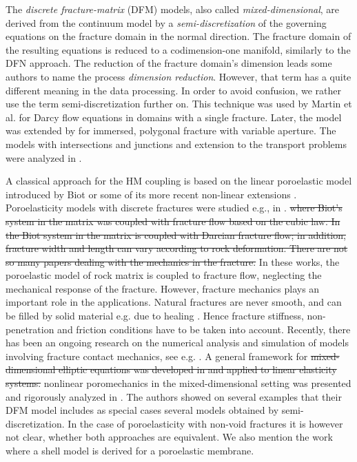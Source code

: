 \documentclass[a4paper]{article}
\numberwithin{equation}{section}
\def\js#1{{\color{blue}#1}}
\begin{document}
The \textit{discrete fracture-matrix} (DFM) models, also called \textit{mixed-dimensional}, are derived from the continuum model by a \textit{semi-discretization} of the governing equations on the fracture domain
in the normal direction. The fracture domain of the resulting equations is reduced to a codimension-one manifold, similarly to the DFN approach. The reduction of the fracture domain's dimension leads some authors to name the process \textit{dimension reduction}. However, that term has a quite different meaning in the data processing. In order to avoid confusion, we rather use the term semi-discretization further on.
% 
This technique was used by Martin et al. \cite{martin_modeling_2005} for Darcy flow equations in domains with a single fracture.
Later, the model was extended by \cite{angot2009asymptotic} for immersed, polygonal fracture with variable aperture. The models with intersections and junctions and extension to the transport problems were analyzed in \cite{maryska2005numerical,pichot2012generalized,formaggia2014reduced, schwenck2015dimensionally,hokr2016real}.

A classical approach for the HM coupling is based on the linear poroelastic model introduced by Biot \cite{biot1941general} or some of its more recent non-linear extensions \cite{rutqvist2003role,Jing2007Fluid}. 
Poroelasticity models with discrete fractures were studied e.g., in \cite{ganis2014modeling,girault_lubrication,girault2019mixed,bukac2017dimensional,hanowski2018hydromechanical}.
\js{\sout{ where Biot's system in the matrix was coupled with fracture flow based on the cubic law.
In %
the Biot system in the matrix is coupled with Darcian fracture flow; in addition, fracture width and length can vary according to rock deformation.
There are not so many papers dealing with the mechanics in the fracture.}
In these works, the poroelastic model of rock matrix is coupled to fracture flow, neglecting the mechanical response of the fracture.
However, fracture mechanics plays an important role in the applications. Natural fractures are never smooth, and can be filled by solid material e.g. due to healing \cite{vass}. Hence fracture stiffness, non-penetration and friction conditions have to be taken into account.
Recently, there has been an ongoing research on the numerical analysis and simulation of models involving fracture contact mechanics, see e.g. \cite{garipov2016discrete,franceschini2020algebraically,berge2019finite,bonaldi2022numerical}.
}
A general framework for \js{\sout{mixed-dimensional elliptic equations was developed in
and applied to linear elasticity systems.}
nonlinear poromechanics in the mixed-dimensional setting was presented and rigorously analyzed in \cite{boon_poro}.
The authors showed on several examples that their DFM model includes as special cases several models obtained by semi-discretization.
In the case of poroelasticity with non-void fractures it is however not clear, whether both approaches are equivalent.}
We also mention the work \cite{mikelic2019derivation} where a shell model is derived for a poroelastic membrane.
\end{document}

